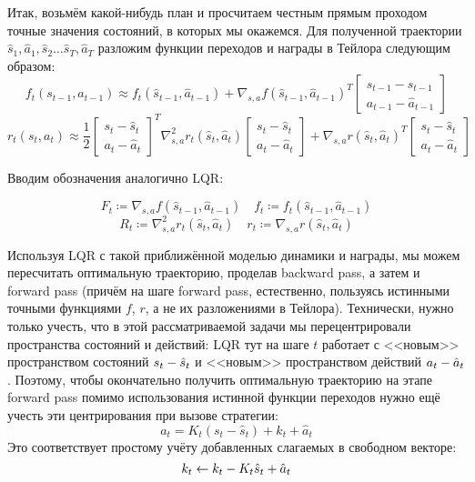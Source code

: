 Итак, возьмём какой-нибудь план и просчитаем честным прямым проходом точные значения состояний, в которых мы окажемся. Для полученной траектории $\hat{s}_1, \hat{a}_1, \hat{s}_2 \dots \hat{s}_T, \hat{a}_T$ разложим функции переходов и награды в Тейлора следующим образом:
$$f_t(s_{t-1}, a_{t-1}) \approx f_t(\hat{s}_{t-1}, \hat{a}_{t-1}) + \nabla_{s, a} f(\hat{s}_{t-1}, \hat{a}_{t-1})^T \begin{bmatrix} s_{t-1} - \hat{s}_{t-1} \\ a_{t-1} - \hat{a}_{t-1} \end{bmatrix}$$
$$r_t(s_t, a_t) \approx \frac{1}{2}\begin{bmatrix} s_t - \hat{s}_t \\ a_t - \hat{a}_t \end{bmatrix}^T \nabla^2_{s, a} r_t(\hat{s}_{t}, \hat{a}_{t})\begin{bmatrix} s_t - \hat{s}_t \\ a_t - \hat{a}_t \end{bmatrix} + \nabla_{s, a} r(\hat{s}_t, \hat{a}_t)^T \begin{bmatrix} s_t - \hat{s}_t \\ a_t - \hat{a}_t \end{bmatrix}$$

Вводим обозначения аналогично LQR:

\begin{equation}\label{TaylorFforLQR}
F_t \coloneqq \nabla_{s, a} f(\hat{s}_{t-1}, \hat{a}_{t-1}) \quad f_t \coloneqq f_t(\hat{s}_{t-1}, \hat{a}_{t-1})
\end{equation}
\begin{equation}\label{TaylorRforLQR}
R_t \coloneqq \nabla^2_{s, a} r_t(\hat{s}_{t}, \hat{a}_{t}) \quad r_t \coloneqq \nabla_{s, a} r(\hat{s}_t, \hat{a}_t)
\end{equation}

Используя LQR с такой приближённой моделью динамики и награды, мы можем пересчитать оптимальную траекторию, проделав backward pass, а затем и forward pass (причём на шаге forward pass, естественно, пользуясь истинными точными функциями $f$, $r$, а не их разложениями в Тейлора). Технически, нужно только учесть, что в этой рассматриваемой задачи мы перецентрировали пространства состояний и действий: LQR тут на шаге $t$ работает с <<новым>> пространством состояний $s_t \HM- \hat{s}_t$ и <<новым>> пространством действий $a_t \HM- \hat{a}_t$. Поэтому, чтобы окончательно получить оптимальную траекторию на этапе forward pass помимо использования истинной функции переходов нужно ещё учесть эти центрирования при вызове стратегии:
$$a_t = K_t (s_t - \hat{s}_t) + k_t + \hat{a}_t$$
Это соответствует простому учёту добавленных слагаемых в свободном векторе:
\begin{equation}\label{iLQR_correction}
k_t \HM\leftarrow k_t - K_t \hat{s}_t + \hat{a}_t
\end{equation}

